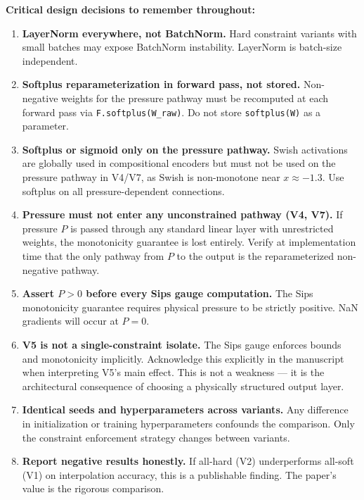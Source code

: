 \documentclass[12pt,a4paper]{article}
\begin{document}
\begin{warningbox}
\textbf{Critical design decisions to remember throughout:}
\begin{enumerate}[noitemsep]
  \item \textbf{LayerNorm everywhere, not BatchNorm.} Hard constraint
    variants with small batches may expose BatchNorm instability.
    LayerNorm is batch-size independent.

  \item \textbf{Softplus reparameterization in forward pass, not stored.}
    Non-negative weights for the pressure pathway must be recomputed
    at each forward pass via \texttt{F.softplus(W\_raw)}.
    Do not store \texttt{softplus(W)} as a parameter.

  \item \textbf{Softplus or sigmoid only on the pressure pathway.}
    Swish activations are globally used in compositional encoders but
    must not be used on the pressure pathway in V4/V7, as Swish is
    non-monotone near $x \approx -1.3$. Use softplus on all
    pressure-dependent connections.

  \item \textbf{Pressure must not enter any unconstrained pathway (V4, V7).}
    If pressure $P$ is passed through any standard linear layer with
    unrestricted weights, the monotonicity guarantee is lost entirely.
    Verify at implementation time that the only pathway from $P$ to the
    output is the reparameterized non-negative pathway.

  \item \textbf{Assert $P > 0$ before every Sips gauge computation.}
    The Sips monotonicity guarantee requires physical pressure to be
    strictly positive. NaN gradients will occur at $P = 0$.

  \item \textbf{V5 is not a single-constraint isolate.} The Sips gauge
    enforces bounds and monotonicity implicitly. Acknowledge this explicitly
    in the manuscript when interpreting V5's main effect. This is not a
    weakness --- it is the architectural consequence of choosing a
    physically structured output layer.

  \item \textbf{Identical seeds and hyperparameters across variants.}
    Any difference in initialization or training hyperparameters
    confounds the comparison. Only the constraint enforcement strategy
    changes between variants.

  \item \textbf{Report negative results honestly.} If all-hard (V2)
    underperforms all-soft (V1) on interpolation accuracy, this is a
    publishable finding. The paper's value is the rigorous comparison.


\end{enumerate}
\end{warningbox}
\end{document}
